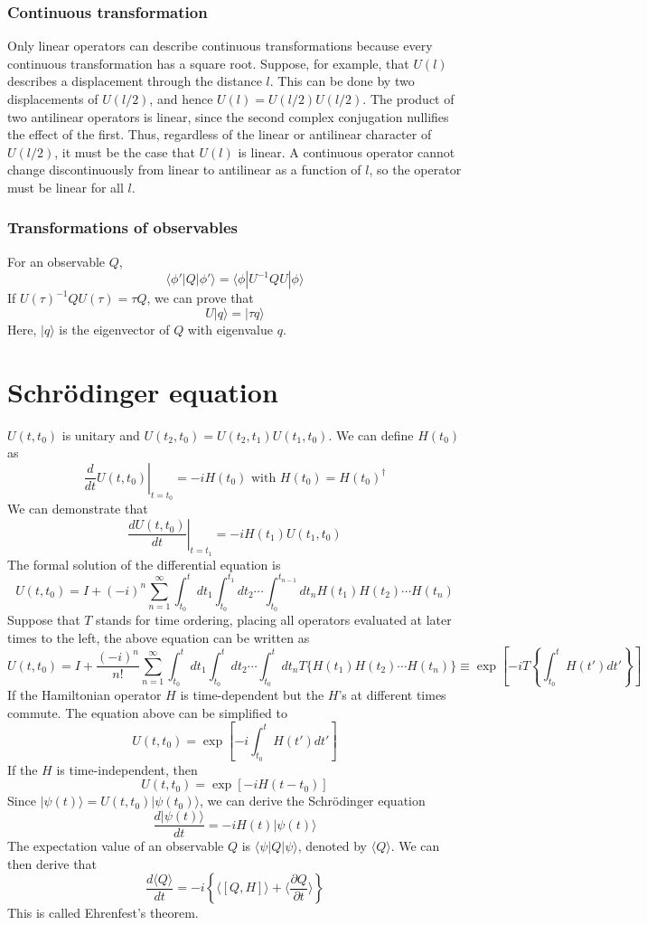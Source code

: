 \documentclass[cyan]{elegantnote}
\begin{document}
\subsubsection{Continuous transformation} 
Only linear operators can describe continuous transformations because every continuous transformation has a square root. Suppose, for example, that $U(l)$ describes a displacement through the distance $l$. This can be done by two displacements of $U(l/2)$, and hence $U(l) = U(l/2) U(l/2)$. The product of two antilinear operators is linear, since the second complex conjugation nullifies the effect of the first. Thus, regardless of the linear or antilinear character of $U(l/2)$, it must be the case that $U(l)$ is linear. A continuous operator cannot change discontinuously from linear to antilinear as a function of $l$, so the operator must be linear for all $l$.

\subsubsection{Transformations of observables}
\noindent
For an observable $Q$, 
\[\langle \phi' | Q | \phi' \rangle = \langle \phi | U^{-1}QU | \phi \rangle \]
If $U(\tau)^{-1}QU(\tau) = \tau Q$, we can prove that
\[U|q\rangle = |\tau q\rangle\]
Here, $|q\rangle$ is the eigenvector of $Q$ with eigenvalue $q$. 


\section{Schr\"{o}dinger equation}
\noindent
$U(t,t_0)$ is unitary and $U(t_2,t_0) = U(t_2,t_1)U(t_1,t_0)$. We can define $H(t_0)$ as
\[\left. \frac{d}{dt}U(t,t_0)\right|_{t=t_0} = -iH(t_0) \mbox{ with } H(t_0) = H(t_0)^{\dagger}\]
We can demonstrate that
\[\left. \frac{dU(t,t_0)}{dt}\right|_{t=t_1} = -iH(t_1)U(t_1,t_0) \]
The formal solution of the differential equation is
\[U(t,t_0) = I + (-i)^n \sum_{n=1}^{\infty} \int_{t_0}^{t}dt_1 \int_{t_0}^{t_1}dt_2 \cdots \int_{t_0}^{t_{n-1}} dt_n H(t_1)H(t_2)\cdots H(t_n)\]
Suppose that $T$ stands for time ordering, placing all operators evaluated at later times to the left, the above equation can be written as
\[U(t,t_0) = I + \frac{(-i)^n}{n!} \sum_{n=1}^{\infty} \int_{t_0}^{t}dt_1 \int_{t_0}^{t}dt_2 \cdots \int_{t_0}^{t} dt_n T\{H(t_1)H(t_2)\cdots H(t_n)\} \equiv \exp \left[ -i T\left\{ \int_{t_0}^{t} H(t')dt'\right\} \right] \]
If the Hamiltonian operator $H$ is time-dependent but the $H$'s at different times commute. The equation above can be simplified to
\[U(t,t_0) = \exp \left[ -i \int_{t_0}^{t} H(t')dt' \right] \]
If the $H$ is time-independent, then
\[U(t,t_0) = \exp \left[ -i H(t-t_0) \right] \]
Since $|\psi(t)\rangle = U(t,t_0) |\psi(t_0)\rangle$, we can derive the Schr\"{o}dinger equation
\[\frac{d |\psi(t)\rangle}{dt} = -iH(t) |\psi(t)\rangle\]
The expectation value of an observable $Q$ is $\langle \psi | Q | \psi \rangle$, denoted by $\langle Q \rangle$. We can then derive that
\[\frac{d\langle Q \rangle}{dt} = -i \left\{ \langle [Q,H] \rangle + \langle \frac{\partial Q}{\partial t} \rangle \right\}\]
This is called Ehrenfest's theorem. 
\end{document}
